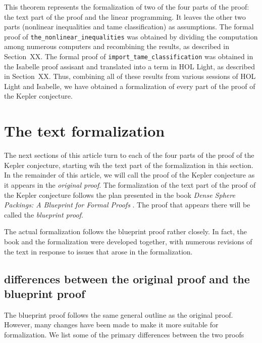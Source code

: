 This theorem represents the formalization of two of the four parts of
the proof: the text part of the proof and the linear programming.  It
leaves the other two parts (nonlinear inequalities and tame
classification) as assumptions.  The formal proof of
\verb!the_nonlinear_inequalities! was obtained by dividing the
computation among numerous computers and recombining the results, as
described in Section~XX.  The formal proof of
\verb!import_tame_classification! was obtained in the Isabelle proof
assisant and translated into a term in HOL Light, as described in
Section~XX.  Thus, combining all of these results from various
sessions of HOL Light and Isabelle, we have obtained a formalization
of every part of the proof of the Kepler conjecture.



\section{The text formalization}


The next sections of this article turn to each of the four parts of the proof of the Kepler
conjecture, starting wih the text part of the formalization in this section.  In the remainder
of this article, we will call the proof of the Kepler conjecture
 as it appears in \cite{DCG} the {\it original proof}.
The formalization of the text part of the proof of the Kepler conjecture follows the plan presented
in the book {\it Dense Sphere Packings: A Blueprint for Formal Proofs} \cite{XX}.  
The proof that appears there will be called the {\it blueprint proof}.

The actual formalization follows the blueprint proof
rather closely.  In fact, the book and the formalization were developed
together, with numerous revisions of the text in response to issues
that arose in the formalization.


\subsection{differences between the original proof and the blueprint proof}

The blueprint proof follows the same general outline as the original
proof.  However, many changes have been made to make it more suitable
for formalization.  We list some of the primary differences between
the two proofs

